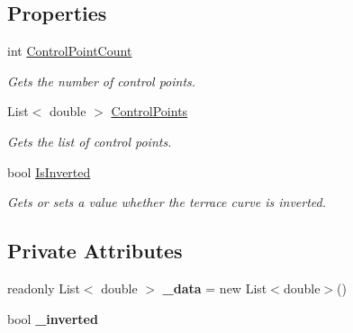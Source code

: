 \subsection*{Properties}
\begin{DoxyCompactItemize}
\item 
int \hyperlink{class_lib_noise_1_1_operator_1_1_terrace_ad5b16a40674b74bdc1e1549453bb5419}{Control\+Point\+Count}
\begin{DoxyCompactList}\small\item\em Gets the number of control points. \end{DoxyCompactList}\item 
List$<$ double $>$ \hyperlink{class_lib_noise_1_1_operator_1_1_terrace_a4daa0a62cdabfbea195b317dc012864a}{Control\+Points}
\begin{DoxyCompactList}\small\item\em Gets the list of control points. \end{DoxyCompactList}\item 
bool \hyperlink{class_lib_noise_1_1_operator_1_1_terrace_afefcda6cc8518201f5d800bf78e8979a}{Is\+Inverted}
\begin{DoxyCompactList}\small\item\em Gets or sets a value whether the terrace curve is inverted. \end{DoxyCompactList}\end{DoxyCompactItemize}
\subsection*{Private Attributes}
\begin{DoxyCompactItemize}
\item 
\mbox{\label{class_lib_noise_1_1_operator_1_1_terrace_add66ebf45e415940447bbe65cde478e1}} 
readonly List$<$ double $>$ {\bfseries \+\_\+data} = new List$<$double$>$()
\item 
\mbox{\label{class_lib_noise_1_1_operator_1_1_terrace_aae9aeed11d82da00df0985ed3c20193b}} 
bool {\bfseries \+\_\+inverted}
\end{DoxyCompactItemize}
